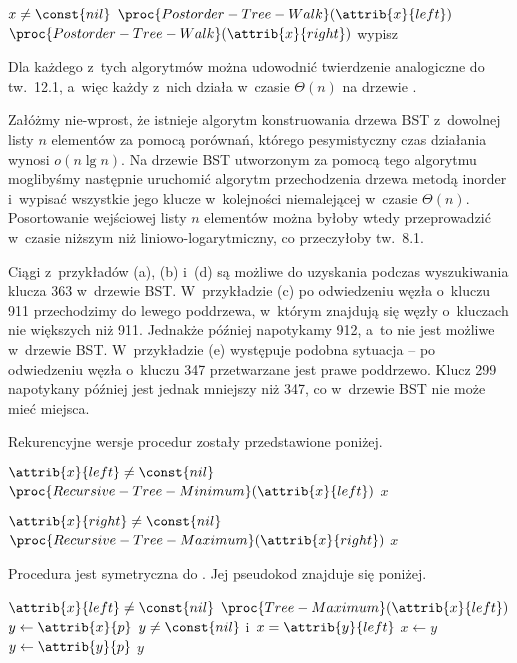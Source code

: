 \begin{codebox}
\li	\If $x\ne\const{nil}$
\li		\Then
			$\proc{Postorder-Tree-Walk}(\attrib{x}{left})$
\li			$\proc{Postorder-Tree-Walk}(\attrib{x}{right})$
\li			wypisz 
		\End
\end{codebox}

Dla każdego z~tych algorytmów można udowodnić twierdzenie analogiczne do tw.\ 12.1, a~więc każdy z~nich działa w~czasie $\Theta(n)$ na drzewie .

\exercise %
Załóżmy nie-wprost, że istnieje algorytm konstruowania drzewa BST z~dowolnej listy $n$ elementów za pomocą porównań, którego pesymistyczny czas działania wynosi $o(n\lg n)$.
Na drzewie BST utworzonym za pomocą tego algorytmu moglibyśmy następnie uruchomić algorytm przechodzenia drzewa metodą inorder i~wypisać wszystkie jego klucze w~kolejności niemalejącej w~czasie $\Theta(n)$.
Posortowanie wejściowej listy $n$ elementów można byłoby wtedy przeprowadzić w~czasie niższym niż liniowo-logarytmiczny, co przeczyłoby tw.\ 8.1.


\exercise %
Ciągi z~przykładów (a), (b) i~(d) są możliwe do uzyskania podczas wyszukiwania klucza 363 w~drzewie BST.
W~przykładzie (c) po odwiedzeniu węzła o~kluczu 911 przechodzimy do lewego poddrzewa, w~którym znajdują się węzły o~kluczach nie większych niż 911.
Jednakże później napotykamy 912, a~to nie jest możliwe w~drzewie BST.
W~przykładzie (e) występuje podobna sytuacja -- po odwiedzeniu węzła o~kluczu 347 przetwarzane jest prawe poddrzewo.
Klucz 299 napotykany później jest jednak mniejszy niż 347, co w~drzewie BST nie może mieć miejsca.

\exercise %
Rekurencyjne wersje procedur zostały przedstawione poniżej.
\begin{codebox}
\li	\If $\attrib{x}{left}\ne\const{nil}$
\li		\Then \Return $\proc{Recursive-Tree-Minimum}(\attrib{x}{left})$
\li		\Else \Return $x$
		\End
\end{codebox}
\begin{codebox}
\li	\If $\attrib{x}{right}\ne\const{nil}$
\li		\Then \Return $\proc{Recursive-Tree-Maximum}(\attrib{x}{right})$
\li		\Else \Return $x$
		\End
\end{codebox}

\exercise %
Procedura  jest symetryczna do .
Jej pseudokod znajduje się poniżej.
\begin{codebox}
\li	\If $\attrib{x}{left}\ne\const{nil}$
\li		\Then \Return $\proc{Tree-Maximum}(\attrib{x}{left})$
		\End
\li	$y\gets\attrib{x}{p}$
\li	\While $y\ne\const{nil}$ i~$x=\attrib{y}{left}$
\li		\Do
			$x\gets y$
\li			$y\gets\attrib{y}{p}$
		\End
\li	\Return $y$
\end{codebox}

